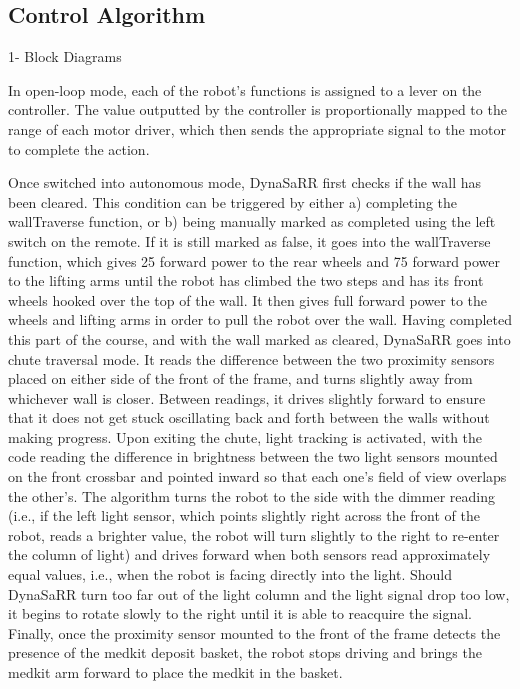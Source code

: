 \subsection{Control Algorithm}
1- Block Diagrams

In open-loop mode, each of the robot's functions is assigned to a lever on the controller. The value outputted by the controller is proportionally mapped to the range of each motor driver, which then sends the appropriate signal to the motor to complete the action.


Once switched into autonomous mode, DynaSaRR first checks if the wall has been cleared. This condition can be triggered by either a) completing the wallTraverse function, or b) being manually marked as completed using the left switch on the remote. If it is still marked as false, it goes into the wallTraverse function, which gives 25 \percent forward power to the rear wheels and 75 \percent forward power to the lifting arms until the robot has climbed the two steps and has its front wheels hooked over the top of the wall. It then gives full forward power to the wheels and lifting arms in order to pull the robot over the wall. Having completed this part of the course, and with the wall marked as cleared, DynaSaRR goes into chute traversal mode. It reads the difference between the two proximity sensors placed on either side of the front of the frame, and turns slightly away from whichever wall is closer. Between readings, it drives slightly forward to ensure that it does not get stuck oscillating back and forth between the walls without making progress. Upon exiting the chute, light tracking is activated, with the code reading the difference in brightness between the two light sensors mounted on the front crossbar and pointed inward so that each one's field of view overlaps the other's. The algorithm turns the robot to the side with the dimmer reading (i.e., if the left light sensor, which points slightly right across the front of the robot, reads a brighter value, the robot will turn slightly to the right to re-enter the column of light) and drives forward when both sensors read approximately equal values, i.e., when the robot is facing directly into the light. Should DynaSaRR turn too far out of the light column and the light signal drop too low, it begins to rotate slowly to the right until it is able to reacquire the signal. Finally, once the proximity sensor mounted to the front of the frame detects the presence of the medkit deposit basket, the robot stops driving and brings the medkit arm forward to place the medkit in the basket.